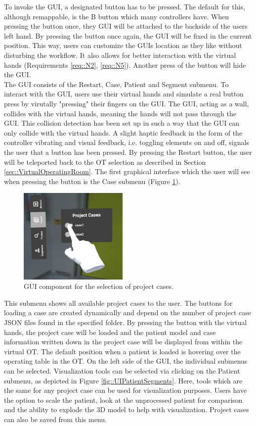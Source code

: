 To invoke the GUI, a designated button has to be pressed.
The default for this, although remappable, is the B button which many controllers have.
When pressing the button once, they GUI will be attached to the backside of the users left hand.
By pressing the button once again, the GUI will be fixed in the current position.
This way, users can customize the GUIs location as they like without disturbing the workflow.
It also allows for better interaction with the virtual hands (Requirements \ref{req::N2}, \ref{req::N5}).
Another press of the button will hide the GUI.
\\ The GUI consists of the Restart, Case, Patient and Segment submenu.
To interact with the GUI, users use their virtual hands and simulate a real button press by virutally "pressing" their fingers on the GUI.
The GUI, acting as a wall, collides with the virtual hands, meaning the hands will not pass through the GUI.
This collision detection has been set up in such a way that the GUI can only collide with the virtual hands.
A slight haptic feedback in the form of the controller vibrating and visual feedback, i.e. toggling elements on and off, signals the user that a button has been pressed.
By pressing the Restart button, the user will be teleported back to the OT selection as described in Section \ref{sec::VirtualOperatingRoom}.
The first graphical interface which the user will see when pressing the button is the Case submenu (Figure \ref{fig::UIProjectCase}).
\begin{figure}[ht]
    \centering
    \includegraphics[width=200px]{images/implementation/user_interface/project_cases.png}
    \caption{\label{fig::UIProjectCase}GUI component for the selection of project cases.}
\end{figure}

This submenu shows all available project cases to the user.
The buttons for loading a case are created dynamically and depend on the number of project case JSON files found in the specified folder.
By pressing the button with the virtual hands, the project case will be loaded and the patient model and case information 
written down in the project case will be displayed from within the virtual OT.
The default position when a patient is loaded is hovering over the operating table in the OT.
On the left side of the GUI, the individual submenus can be selected.
Visualization tools can be selected via clicking on the Patient submenu, as depicted in Figure \ref{fig::UIPatientSegments}.
Here, tools which are the same for any project case can be used for visualization purposes.
Users have the option to scale the patient, look at the unprocessed patient for comparison and the ability to explode the 3D model to help with visualization.
Project cases can also be saved from this menu.

